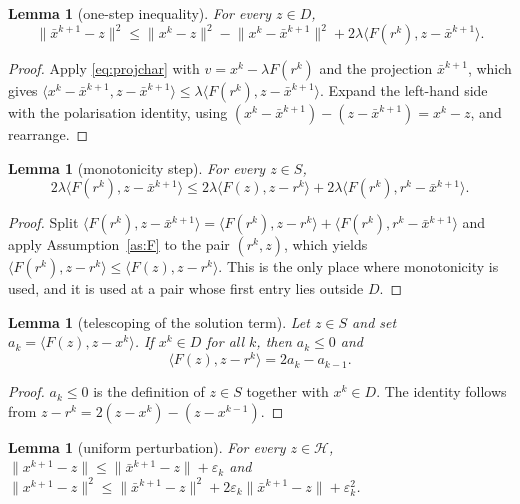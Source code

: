 \documentclass[11pt]{article}
\theoremstyle{plain}
\newtheorem{lemma}[theorem]{Lemma}
\theoremstyle{definition}
\theoremstyle{remark}
\newcommand{\HH}{\mathcal{H}}
\newcommand{\inner}[2]{\langle #1, #2 \rangle}
\newcommand{\norm}[1]{\lVert #1 \rVert}
\begin{document}
\begin{lemma}[one-step inequality]
\label{lem:onestep}
For every $z \in D$,
\[
\norm{\bar x^{k+1} - z}^2 \le \norm{x^k - z}^2 - \norm{x^k - \bar x^{k+1}}^2
+ 2\lambda \inner{F(r^k)}{z - \bar x^{k+1}} .
\]
\end{lemma}

\begin{proof}
Apply \eqref{eq:projchar} with $v = x^k - \lambda F(r^k)$ and the projection
$\bar x^{k+1}$, which gives
$\inner{x^k - \bar x^{k+1}}{z - \bar x^{k+1}} \le \lambda
\inner{F(r^k)}{z - \bar x^{k+1}}$. Expand the left-hand side with the
polarisation identity, using $(x^k - \bar x^{k+1}) - (z - \bar x^{k+1}) = x^k
- z$, and rearrange.
\end{proof}

\begin{lemma}[monotonicity step]
\label{lem:mono}
For every $z \in S$,
\[
2\lambda \inner{F(r^k)}{z - \bar x^{k+1}} \le
2\lambda \inner{F(z)}{z - r^k} + 2\lambda \inner{F(r^k)}{r^k - \bar x^{k+1}} .
\]
\end{lemma}

\begin{proof}
Split $\inner{F(r^k)}{z - \bar x^{k+1}} = \inner{F(r^k)}{z-r^k} +
\inner{F(r^k)}{r^k - \bar x^{k+1}}$ and apply Assumption~\ref{as:F} to the
pair $(r^k, z)$, which yields $\inner{F(r^k)}{z-r^k} \le
\inner{F(z)}{z-r^k}$. This is the only place where monotonicity is used, and
it is used at a pair whose first entry lies outside $D$.
\end{proof}

\begin{lemma}[telescoping of the solution term]
\label{lem:tele}
Let $z \in S$ and set $a_k = \inner{F(z)}{z - x^k}$. If $x^k \in D$ for all
$k$, then $a_k \le 0$ and
\[
\inner{F(z)}{z - r^k} = 2a_k - a_{k-1} .
\]
\end{lemma}

\begin{proof}
$a_k \le 0$ is the definition of $z \in S$ together with $x^k \in D$. The
identity follows from $z - r^k = 2(z-x^k) - (z-x^{k-1})$.
\end{proof}

\begin{lemma}[uniform perturbation]
\label{lem:pert}
For every $z \in \HH$,
$\norm{x^{k+1} - z} \le \norm{\bar x^{k+1} - z} + \varepsilon_k$ and
$\norm{x^{k+1} - z}^2 \le \norm{\bar x^{k+1} - z}^2
 + 2\varepsilon_k \norm{\bar x^{k+1} - z} + \varepsilon_k^2$.
\end{lemma}
\end{document}
